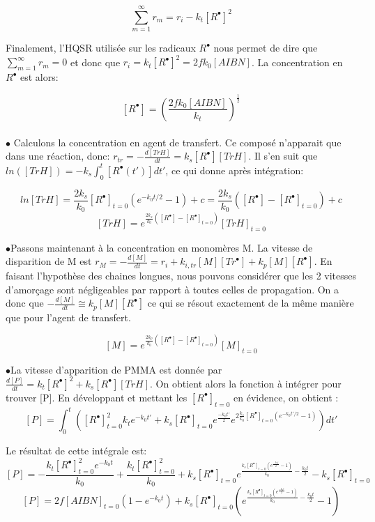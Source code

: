 \documentclass[a4paper,oneside,12pt]{article}
\begin{document}
\begin{equation}
\sum\limits_{m=1}^\infty r_{m}=r_i-k_{t}[R^{\bullet}]^2
\end{equation}

Finalement, l'HQSR utilisée sur les radicaux $R^{\bullet}$ nous permet de dire que $\sum\limits_{m=1}^\infty r_{m}=0$ et donc que $r_i=k_{t}[R^{\bullet}]^2=2fk_{0}[AIBN]$. La concentration en $R^{\bullet}$ est alors:

$$[R^{\bullet}]=(\frac{2fk_{0}[AIBN]}{k_t})^{\frac{1}{2}}$$\\

$\bullet$ Calculons la concentration en agent de transfert. Ce composé n'apparait que dans une réaction, donc: $r_{tr}=-\frac{d[TrH]}{dt}=k_s[R^{\bullet}][TrH]$. Il s'en suit que $ln([TrH])=-k_s\int_{0}^t [R^{\bullet}(t')]dt'$, ce qui donne après intégration:

$$ln[TrH]=\frac{2k_{s}}{k_0}[R^{\bullet}]_{t=0}(e^{-k_{0}t/2} - 1)+c=\frac{2k_{s}}{k_0}([R^{\bullet}]-[R^{\bullet}]_{t=0})+c$$
$$[TrH]=e^{\frac{2k_{s}}{k_0}([R^{\bullet}]-[R^{\bullet}]_{t=0})}[TrH]_{t=0}$$


$\bullet$Passons maintenant à la concentration en monomères M. La vitesse de disparition de M est $r_M = -\frac{d[M]}{dt}=r_{i}+k_{i,tr}[M][Tr^{\bullet}]+k_{p}[M][R^{\bullet}]$. En faisant l'hypothèse des chaines longues, nous pouvons considérer que les 2 vitesses d'amorçage sont négligeables par rapport à toutes celles de propagation. On a donc que $-\frac{d[M]}{dt}\cong k_{p}[M][R^{\bullet}]$ ce qui se résout exactement de la même manière que pour l'agent de transfert.

$$[M]=e^{\frac{2k_{p}}{k_0}([R^{\bullet}]-[R^{\bullet}]_{t=0})}[M]_{t=0}$$

$\bullet$La vitesse d'apparition de PMMA est donnée par $\frac{d[P]}{dt}=k_{t}[R^{\bullet}]^2+k_{s}[R^{\bullet}][TrH]$. On obtient alors la fonction à intégrer pour trouver [P]. En développant et mettant les $[R^{\bullet}]_{t=0}$ en évidence, on obtient :
$$[P]=\int_{0}^t ([R^{\bullet}]^{2}_{t=0}k_te^{-k_0t'}+k_s[R^{\bullet}]_{t=0}e^{\frac{-k_0t'}{2}}e^{2\frac{k_s}{k_0}[R^{\bullet}]_{t=0}(e^{-k_0t'/2}-1)})dt'$$

Le résultat de cette intégrale est:
$$[P]=-\frac{k_t[R^{\bullet}]_{t=0}^2e^{-k_0t}}{k_0}+\frac{k_t[R^{\bullet}]_{t=0}^2}{k_0}+k_s[R^{\bullet}]_{t=0}e^{\frac{k_s[R^{\bullet}]_{t=0}(e^{\frac{-k_0t}{2}}-1)}{k_0}-\frac{k_0t}{2}}-k_s[R^{\bullet}]_{t=0}$$
$$[P]=2f[AIBN]_{t=0}(1-e^{-k_0t})+k_s[R^{\bullet}]_{t=0}(e^{\frac{k_s[R^{\bullet}]_{t=0}(e^{\frac{-k_0t}{2}}-1)}{k_0}-\frac{k_0t}{2}}-1)$$
\end{document}
